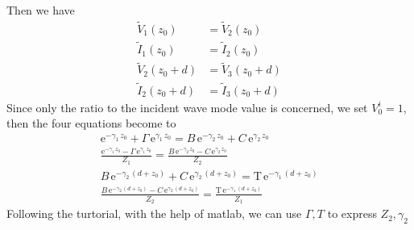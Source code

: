 \documentclass{article}
\begin{document}
Then we have
\begin{align*}
    \tilde{V}_1(z_0) &= \tilde{V}_2(z_0)\\
    \tilde{I}_1(z_0) &= \tilde{I}_2(z_0)\\
    \tilde{V}_2(z_0+d) &= \tilde{V}_3(z_0+d)\\
    \tilde{I}_2(z_0+d) &= \tilde{I}_3(z_0+d)
\end{align*}
Since only the ratio to the incident wave mode value is concerned, we set $V_0^i=1$, then the four equations become to
\begin{align*}
    {\mathrm{e}}^{-\gamma_1 \,z_0 } +\Gamma \,{\mathrm{e}}^{\gamma_1 \,z_0 } =B\,{\mathrm{e}}^{-\gamma_2 \,z_0 } +C\,{\mathrm{e}}^{\gamma_2 \,z_0 }\\
    \frac{{\mathrm{e}}^{-\gamma_1 \,z_0 } -\Gamma \,{\mathrm{e}}^{\gamma_1 \,z_0 } }{Z_1 }=\frac{B\,{\mathrm{e}}^{-\gamma_2 \,z_0 } -C\,{\mathrm{e}}^{\gamma_2 \,z_0 } }{Z_2 }\\
    B\,{\mathrm{e}}^{-\gamma_2 \,{\left(d+z_0 \right)}} +C\,{\mathrm{e}}^{\gamma_2 \,{\left(d+z_0 \right)}} =\mathrm{T}\,{\mathrm{e}}^{-\gamma_1 \,{\left(d+z_0 \right)}}\\
    \frac{B\,{\mathrm{e}}^{-\gamma_2 \,{\left(d+z_0 \right)}} -C\,{\mathrm{e}}^{\gamma_2 \,{\left(d+z_0 \right)}} }{Z_2 }=\frac{\mathrm{T}\,{\mathrm{e}}^{-\gamma_1 \,{\left(d+z_0 \right)}} }{Z_1 }
\end{align*}
Following the turtorial, with the help of matlab, we can use $\Gamma,T$ to express  $Z_2,\gamma_2$
\end{document}
